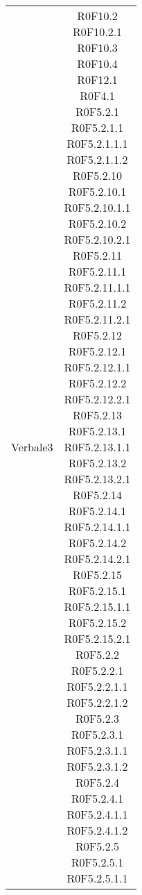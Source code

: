 \begin{center}
\begin{longtable}{|c|c|}
Verbale3 & \parbox[t]{\dimFonti}{R0F10.2 \\R0F10.2.1 \\R0F10.3 \\R0F10.4 \\R0F12.1 \\R0F4.1 \\R0F5.2.1 \\R0F5.2.1.1 \\R0F5.2.1.1.1 \\R0F5.2.1.1.2 \\R0F5.2.10 \\R0F5.2.10.1 \\R0F5.2.10.1.1 \\R0F5.2.10.2 \\R0F5.2.10.2.1 \\R0F5.2.11 \\R0F5.2.11.1 \\R0F5.2.11.1.1 \\R0F5.2.11.2 \\R0F5.2.11.2.1 \\R0F5.2.12 \\R0F5.2.12.1 \\R0F5.2.12.1.1 \\R0F5.2.12.2 \\R0F5.2.12.2.1 \\R0F5.2.13 \\R0F5.2.13.1 \\R0F5.2.13.1.1 \\R0F5.2.13.2 \\R0F5.2.13.2.1 \\R0F5.2.14 \\R0F5.2.14.1 \\R0F5.2.14.1.1 \\R0F5.2.14.2 \\R0F5.2.14.2.1 \\R0F5.2.15 \\R0F5.2.15.1 \\R0F5.2.15.1.1 \\R0F5.2.15.2 \\R0F5.2.15.2.1 \\R0F5.2.2 \\R0F5.2.2.1 \\R0F5.2.2.1.1 \\R0F5.2.2.1.2 \\R0F5.2.3 \\R0F5.2.3.1 \\R0F5.2.3.1.1 \\R0F5.2.3.1.2 \\R0F5.2.4 \\R0F5.2.4.1 \\R0F5.2.4.1.1 \\R0F5.2.4.1.2 \\R0F5.2.5 \\R0F5.2.5.1 \\R0F5.2.5.1.1 \\}\\



\end{longtable}
\end{center}

